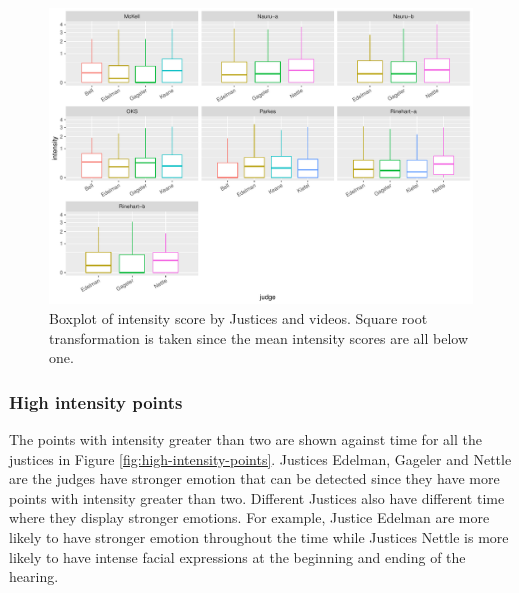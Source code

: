 \documentclass{monashthesis}
\begin{document}
\begin{figure}

{\centering \includegraphics[width=1\linewidth]{figures/intensity-boxplot-1} 

}

\caption{Boxplot of intensity score by Justices and videos. Square root transformation is taken since the mean intensity scores are all below one.  \label{fig:intensity}}\label{fig:intensity-boxplot}
\end{figure}

\hypertarget{high-intensity-points}{%
\subsubsection{High intensity points}\label{high-intensity-points}}

The points with intensity greater than two are shown against time for all the justices in Figure \ref{fig:high-intensity-points}. Justices Edelman, Gageler and Nettle are the judges have stronger emotion that can be detected since they have more points with intensity greater than two. Different Justices also have different time where they display stronger emotions. For example, Justice Edelman are more likely to have stronger emotion throughout the time while Justices Nettle is more likely to have intense facial expressions at the beginning and ending of the hearing.
\end{document}
